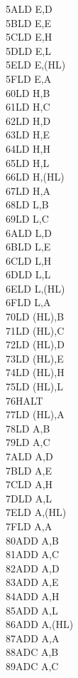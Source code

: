 \documentclass[12pt,twoside,openright,a4paper]{book}
\begin{document}
\begin{multicols}{3}
{\begin{tabbing}
	5A\>LD E,D\\
	5B\>LD E,E\\
	5C\>LD E,H\\
	5D\>LD E,L\\
	5E\>LD E,(HL)\\
	5F\>LD E,A\\
	60\>LD H,B\\
	61\>LD H,C\\
	62\>LD H,D\\
	63\>LD H,E\\
	64\>LD H,H\\
	65\>LD H,L\\
	66\>LD H,(HL)\\
	67\>LD H,A\\
	68\>LD L,B\\
	69\>LD L,C\\
	6A\>LD L,D\\
	6B\>LD L,E\\
	6C\>LD L,H\\
	6D\>LD L,L\\
	6E\>LD L,(HL)\\
	6F\>LD L,A\\
	70\>LD (HL),B\\
	71\>LD (HL),C\\
	72\>LD (HL),D\\
	73\>LD (HL),E\\
	74\>LD (HL),H\\
	75\>LD (HL),L\\
	76\>HALT\\
	77\>LD (HL),A\\
	78\>LD A,B\\
	79\>LD A,C\\
	7A\>LD A,D\\
	7B\>LD A,E\\
	7C\>LD A,H\\
	7D\>LD A,L\\
	7E\>LD A,(HL)\\
	7F\>LD A,A\\
	80\>ADD A,B\\
	81\>ADD A,C\\
	82\>ADD A,D\\
	83\>ADD A,E\\
	84\>ADD A,H\\
	85\>ADD A,L\\
	86\>ADD A,(HL)\\
	87\>ADD A,A\\
	88\>ADC A,B\\
	89\>ADC A,C\\

\end{tabbing}}
\end{multicols}
\end{document}
